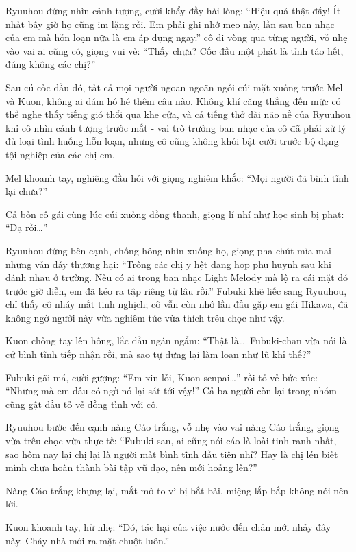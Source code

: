 \documentclass[../main.tex]{subfiles}
\begin{document}
Ryuuhou đứng nhìn cảnh tượng, cười khẩy đầy hài lòng: ``Hiệu quả thật đấy! Ít nhất bây giờ họ cũng im lặng rồi. Em phải ghi nhớ mẹo này, lần sau ban nhạc của em mà hỗn loạn nữa là em áp dụng ngay.'' cô đi vòng qua từng người, vỗ nhẹ vào vai ai cũng có, giọng vui vẻ: ``Thấy chưa? Cốc đầu một phát là tỉnh táo hết, đúng không các chị?''

\ct

Sau cú cốc đầu đó, tất cả mọi người ngoan ngoãn ngồi cúi mặt xuống trước Mel và Kuon, không ai dám hó hé thêm câu nào. Không khí căng thẳng đến mức có thể nghe thấy tiếng gió thổi qua khe cửa, và cả tiếng thở dài não nề của Ryuuhou khi cô nhìn cảnh tượng trước mắt - vai trò trưởng ban nhạc của cô đã phải xử lý đủ loại tình huống hỗn loạn, nhưng cô cũng không khỏi bật cười trước bộ dạng tội nghiệp của các chị em.

Mel khoanh tay, nghiêng đầu hỏi với giọng nghiêm khắc: ``Mọi người đã bình tĩnh lại chưa?''

Cả bốn cô gái cùng lúc cúi xuống đồng thanh, giọng lí nhí như học sinh bị phạt: ``Dạ rồi\dots''

Ryuuhou đứng bên cạnh, chống hông nhìn xuống họ, giọng pha chút mỉa mai nhưng vẫn đầy thương hại: ``Trông các chị y hệt đang họp phụ huynh sau khi đánh nhau ở trường. Nếu có ai trong ban nhạc Light Melody mà lộ ra cái mặt đó trước giờ diễn, em đã kéo ra tập riêng từ lâu rồi.'' Fubuki khẽ liếc sang Ryuuhou, chỉ thấy cô nháy mắt tinh nghịch; cô vẫn còn nhớ lần đầu gặp em gái Hikawa, đã không ngờ người này vừa nghiêm túc vừa thích trêu chọc như vậy.

Kuon chống tay lên hông, lắc đầu ngán ngẩm: ``Thật là\dots\ Fubuki-chan vừa nói là cứ bình tĩnh tiếp nhận rồi, mà sao tự dưng lại làm loạn như lũ khỉ thế?''

Fubuki gãi má, cười gượng: ``Em xin lỗi, Kuon-senpai\dots'' rồi tỏ vẻ bức xúc: ``Nhưng mà em đâu có ngờ nó lại sát tới vậy!'' Cả ba người còn lại trong nhóm cũng gật đầu tỏ vẻ đồng tình với cô.

Ryuuhou bước đến cạnh nàng Cáo trắng, vỗ nhẹ vào vai nàng Cáo trắng, giọng vừa trêu chọc vừa thực tế: ``Fubuki-san, ai cũng nói cáo là loài tinh ranh nhất, sao hôm nay lại chị lại là người mất bình tĩnh đầu tiên nhỉ? Hay là chị lén biết mình chưa hoàn thành bài tập vũ đạo, nên mới hoảng lên?''

Nàng Cáo trắng khựng lại, mắt mở to vì bị bắt bài, miệng lắp bắp không nói nên lời.

Kuon khoanh tay, hừ nhẹ: ``Đó, tác hại của việc nước đến chân mới nhảy đây này. Cháy nhà mới ra mặt chuột luôn.''
\end{document}
